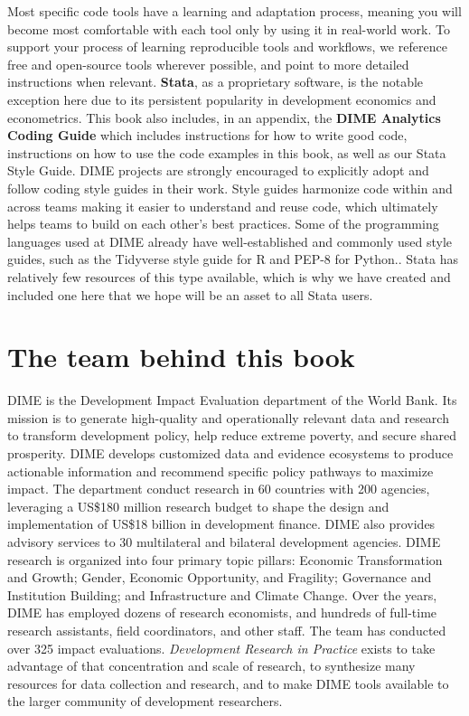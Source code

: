 {Most specific code tools have a learning and adaptation process,
meaning you will become most comfortable with each tool
only by using it in real-world work.
To support your process of learning reproducible tools and workflows,
we reference free and open-source tools wherever possible,
and point to more detailed instructions when relevant.
\textbf{Stata},
as a proprietary software, is the notable exception here
due to its persistent popularity in development economics and econometrics.
This book also includes, in an appendix,
the \textbf{DIME Analytics Coding Guide}
which includes instructions for how to write good code,
instructions on how to use the code examples in this book,
as well as our Stata Style Guide.
DIME projects are strongly encouraged to
explicitly adopt and follow coding style guides in their work.
Style guides harmonize code within and across teams
making it easier to understand and reuse code,
which ultimately helps teams to
build on each other's best practices.
Some of the programming languages used at DIME
already have well-established and commonly used style guides,
such as the Tidyverse style guide for R
and PEP-8 for Python..
Stata has relatively few resources of this type available,
which is why we have created and included one here that
we hope will be an asset to all Stata users.

\section{The team behind this book}
DIME is the Development Impact Evaluation department of the World Bank.
Its mission is to generate high-quality and operationally relevant data and research
to transform development policy, help reduce extreme poverty, and secure shared prosperity.
DIME develops customized data and evidence ecosystems to produce actionable information
and recommend specific policy pathways to maximize impact.
The department conduct research in 60 countries with 200 agencies, leveraging a
US\$180 million research budget to shape the design and implementation of
US\$18 billion in development finance.
DIME also provides advisory services to 30 multilateral and bilateral development agencies.
DIME research is organized into four primary topic pillars:
Economic Transformation and Growth;
Gender, Economic Opportunity, and Fragility;
Governance and Institution Building;
and Infrastructure and Climate Change.
Over the years, DIME has employed dozens of research economists,
and hundreds of full-time research assistants, field coordinators, and other staff.
The team has conducted over 325 impact evaluations.
\textit{Development Research in Practice} exists to take advantage of that concentration and scale of research,
to synthesize many resources for data collection and research,
and to make DIME tools available to the larger community of development researchers.

}
